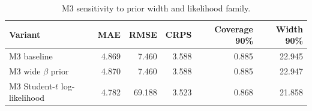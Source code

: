 \begin{table}[H]
\centering
\caption{{M3 sensitivity to prior width and likelihood family.}\label{tab:s3-sensitivity}}
\small
\begin{tabular}{lrrrrr}
\toprule
Variant & MAE & RMSE & CRPS & Coverage 90\% & Width 90\%\\
\midrule
M3 baseline & 4.869 & 7.460 & 3.588 & 0.885 & 22.945\\
M3 wide $\beta$ prior & 4.870 & 7.460 & 3.588 & 0.885 & 22.947\\
M3 Student-$t$ log-likelihood & 4.782 & 69.188 & 3.523 & 0.868 & 21.858\\
\bottomrule
\end{tabular}
\end{table}

